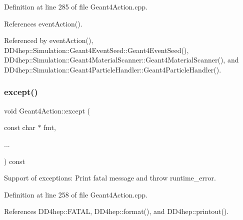 Definition at line 285 of file Geant4\+Action.\+cpp.



References event\+Action().



Referenced by event\+Action(), D\+D4hep\+::\+Simulation\+::\+Geant4\+Event\+Seed\+::\+Geant4\+Event\+Seed(), D\+D4hep\+::\+Simulation\+::\+Geant4\+Material\+Scanner\+::\+Geant4\+Material\+Scanner(), and D\+D4hep\+::\+Simulation\+::\+Geant4\+Particle\+Handler\+::\+Geant4\+Particle\+Handler().

\hypertarget{class_d_d4hep_1_1_simulation_1_1_geant4_action_a9817394f45f311d2fb19f544e9a72e23}{}\label{class_d_d4hep_1_1_simulation_1_1_geant4_action_a9817394f45f311d2fb19f544e9a72e23} 
\subsubsection{\texorpdfstring{except()}{except()}}
{\footnotesize\ttfamily void Geant4\+Action\+::except (\begin{DoxyParamCaption}\item[{const char $\ast$}]{fmt,  }\item[{}]{... }\end{DoxyParamCaption}) const}



Support of exceptions\+: Print fatal message and throw runtime\+\_\+error. 



Definition at line 258 of file Geant4\+Action.\+cpp.



References D\+D4hep\+::\+F\+A\+T\+AL, D\+D4hep\+::format(), and D\+D4hep\+::printout().



